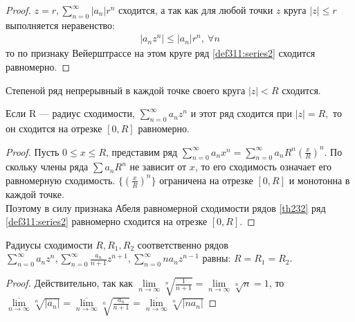 \begin{proof}
  $z = r, \sum\limits_{n = 0}^{\infty} |a_n| r^n$ сходится, а так как для любой
  точки $z$ круга $|z| \leq r$ выполняется неравенство:
  \begin{gather*}
    |a_n z^n| \leq |a_n| r^n, \ \forall n
  \end{gather*}
  то по признаку Вейерштрассе на этом круге ряд \eqref{def311:series2} сходится
  равномерно.
\end{proof}

\begin{consequence}
  Степеной ряд непрерывный в каждой точке своего круга $|z| < R$ сходится.
\end{consequence}

\begin{theorem}[2-ая т. Абеля]
  \label{th313}
  Если R --- радиус сходимости, $\sum\limits_{n = 0}^{\infty} a_n z^n$ и этот
  ряд сходится при $|z| = R,$ то он сходится на отрезке $[0, R]$ равномерно.
\end{theorem}

\begin{proof}
  Пусть $0 \leq x \leq R$, представим ряд $\sum\limits_{n = 0}^{\infty} a_n x^n
  = \sum\limits_{n = 0}^{\infty} a_n R^n\left(\frac{x}{R}\right)^n$. По скольку
  члены ряда $\sum a_n R^n$ не зависит от $x$, то его сходимость означает его
  равномерную сходимость. $\{(\frac{x}{R})^n\}$ ограничена на отрезке $[0, R]$
  и монотонна в каждой точке. \\
  Поэтому в силу признака Абеля равномерной сходимости рядов \eqref{th232} ряд
  \eqref{def311:series2} равномерно сходится на отрезке $[0, R]$.
\end{proof}

\begin{lemma}
  \label{ch3:lemma1}
  Радиусы сходимости $R, R_1, R_2$ соответственно рядов
  $\sum\limits_{n = 0}^{\infty} a_n z^n, \sum\limits_{n = 0}^{\infty}
  \frac{a_n}{n + 1} z^{n+1}, \sum\limits_{n = 0}^{\infty} n a_n z^{n - 1}$ равны:
  $R = R_1 = R_2$.
\end{lemma}

\begin{proof}
  Действительно, так как $\lim\limits_{n \to \infty} \sqrt[n]{\frac{1}{n + 1}}=
  \lim\limits_{n \to \infty} \sqrt[n]{n} = 1$, то \\
  $\overline{\lim\limits_{n \to \infty}} \sqrt[n]{|a_n|} =
  \overline{\lim\limits_{n \to \infty}} \sqrt[n]{\frac{a_n}{n + 1}}=
  \overline{\lim\limits_{n \to \infty}} \sqrt[n]{|n a_n|}$
\end{proof}

